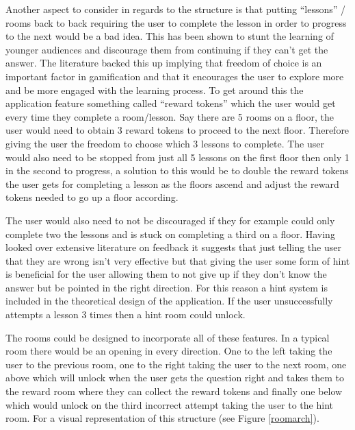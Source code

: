 \documentclass[12pt,a4paper]{article}
\begin{document}
Another aspect to consider in regards to the structure is that putting “lessons” / rooms back to back requiring the user to complete the lesson in order to progress to the next would be a bad idea. This has been shown to stunt the learning of younger audiences and discourage them from continuing if they can’t get the answer. The literature backed this up implying that freedom of choice is an important factor in gamification and that it encourages the user to explore more and be more engaged with the learning process. To get around this the application feature something called “reward tokens” which the user would get every time they complete a room/lesson. Say there are 5 rooms on a floor, the user would need to obtain 3 reward tokens to proceed to the next floor. Therefore giving the user the freedom to choose which 3 lessons to complete. The user would also need to be stopped from just all 5 lessons on the first floor then only 1 in the second to progress, a solution to this would be to double the reward tokens the user gets for completing a lesson as the floors ascend and adjust the reward tokens needed to go up a floor according. 



The user would also need to not be discouraged if they for example could only complete two the lessons and is stuck on completing a third on a floor. Having looked over extensive literature on feedback it suggests that just telling the user that they are wrong isn’t very effective but that giving the user some form of hint is beneficial for the user allowing them to not give up if they don’t know the answer but be pointed in the right direction. For this reason a hint system is included in the theoretical design of the application.  If the user unsuccessfully attempts a lesson 3 times then a hint room could unlock. 

The rooms could be designed to incorporate all of these features. In a typical room there would be an opening in every direction. One to the left taking the user to the previous room, one to the right taking the user to the next room, one above which will unlock when the user gets the question right and takes them to the reward room where they can collect the reward tokens and finally one below which would unlock on the third incorrect attempt taking the user to the hint room. For a visual representation of this structure  (see Figure \ref{roomarch}). 
\end{document}
